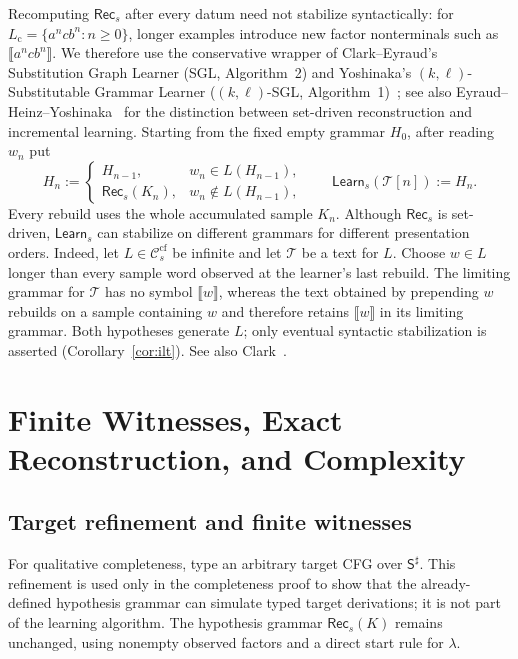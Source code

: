 \documentclass[11pt,a4paper]{article}
\newcommand{\NT}[1]{\llbracket #1\rrbracket}
\theoremstyle{remark}
\theoremstyle{plain}
\newcommand{\cf}{\mathrm{cf}}
\newcommand{\Ccf}[1]{\mathcal C_{#1}^{\cf}}
\begin{document}
Recomputing $\mathsf{Rec}_s$ after every datum need not stabilize
syntactically: for $L_{\mathrm c}=\{a^ncb^n:n\ge0\}$, longer examples
introduce new factor nonterminals such as $\NT{a^ncb^n}$.
We therefore use the conservative wrapper of Clark--Eyraud's
Substitution Graph Learner (SGL, Algorithm~2) and Yoshinaka's
$(k,\ell)$-Substitutable Grammar Learner ($(k,\ell)$-SGL, Algorithm~1)~\cite{clark-eyraud2007,yoshinaka2008};
see also Eyraud--Heinz--Yoshinaka~\cite[Appendix]{eyraud-heinz-yoshinaka2016}
for the distinction between set-driven reconstruction and incremental learning.
Starting from the fixed empty grammar $H_0$, after reading $w_n$ put
\[
 H_n:=
 \begin{cases}
 H_{n-1},&w_n\in L(H_{n-1}),\\
 \mathsf{Rec}_s(K_n),&w_n\notin L(H_{n-1}),
 \end{cases}
 \qquad
 \mathsf{Learn}_s(\mathcal T[n]):=H_n.
\]
Every rebuild uses the whole accumulated sample $K_n$. Although
$\mathsf{Rec}_s$ is set-driven, $\mathsf{Learn}_s$ can stabilize on
different grammars for different presentation orders. Indeed, let $L\in\Ccf{s}$ be infinite and let
$\mathcal T$ be a text for $L$. Choose $w\in L$ longer than
every sample word observed at the learner's last rebuild.
The limiting grammar for $\mathcal T$ has no symbol $\NT{w}$,
whereas the text obtained by prepending $w$ rebuilds on a sample
containing $w$ and therefore retains $\NT{w}$ in its limiting
grammar. Both hypotheses generate $L$; only eventual syntactic
stabilization is asserted (Corollary~\ref{cor:ilt}).
See also Clark~\cite[Section~4, Example~1]{clark2013}.

\section{Finite Witnesses, Exact Reconstruction, and Complexity}
\label{sec:typing}


\subsection{Target refinement and finite witnesses}

For qualitative completeness, type an arbitrary target
CFG over $\mathsf S^\sharp$.  This refinement is used only in
the completeness proof to show that the already-defined hypothesis
grammar can simulate typed target derivations; it is not part of
the learning algorithm. The hypothesis grammar
$\mathsf{Rec}_s(K)$ remains unchanged, using nonempty observed
factors and a direct start rule for $\lambda$.
\end{document}
